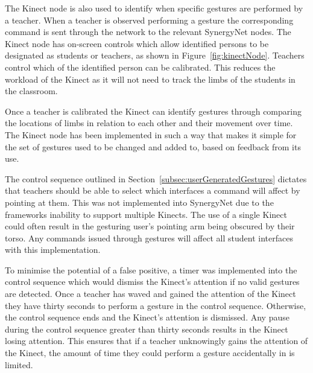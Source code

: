 \documentclass[link]{IWCOMP}
\begin{document}
The Kinect node is also used to identify when specific gestures are performed by a teacher.
When a teacher is observed performing a gesture the corresponding command is sent through the network to the relevant SynergyNet nodes.
The Kinect node has on-screen controls which allow identified persons to be designated as students or teachers, as shown in Figure~\ref{fig:kinectNode}.
Teachers control which of the identified person can be calibrated.
This reduces the workload of the Kinect as it will not need to track the limbs of the students in the classroom.

Once a teacher is calibrated the Kinect can identify gestures through comparing the locations of limbs in relation to each other and their movement over time.
The Kinect node has been implemented in such a way that makes it simple for the set of gestures used to be changed and added to, based on feedback from its use.

The control sequence outlined in Section~\ref{subsec:userGeneratedGestures} dictates that teachers should be able to select which interfaces a command will affect by pointing at them.
This was not implemented into SynergyNet due to the frameworks inability to support multiple Kinects.
The use of a single Kinect could often result in the gesturing user's pointing arm being obscured by their torso.
Any commands issued through gestures will affect all student interfaces with this implementation.

To minimise the potential of a false positive, a timer was implemented into the control sequence which would dismiss the Kinect's attention if no valid gestures are detected.
Once a teacher has waved and gained the attention of the Kinect they have thirty seconds to perform a gesture in the control sequence.
Otherwise, the control sequence ends and the Kinect's attention is dismissed.
Any pause during the control sequence greater than thirty seconds results in the Kinect losing attention.
This ensures that if a teacher unknowingly gains the attention of the Kinect, the amount of time they could perform a gesture accidentally in is limited.
\end{document}
